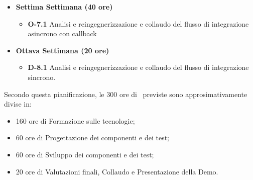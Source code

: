 \begin{itemize}
       \item \textbf{Settima Settimana (40 ore)}
       \begin{itemize}
           \item \textbf{O-7.1} Analisi e reingegnerizzazione e collaudo del flusso di integrazione asincrono con callback

       \end{itemize}

       \item \textbf{Ottava Settimana (20 ore)}
       \begin{itemize}
           \item \textbf{D-8.1} Analisi e reingegnerizzazione e collaudo del flusso di integrazione sincrono.
       \end{itemize}

\end{itemize}
\noindent
Secondo questa pianificazione, le 300 ore di \stage\ previste sono approsimativamente divise in:
\begin{itemize}
  \item 160 ore di Formazione sulle tecnologie;
  \item 60 ore di Progettazione dei componenti e dei test;
  \item 60 ore di Sviluppo dei componenti e dei test;
  \item 20 ore di Valutazioni finali, Collaudo e Presentazione della Demo.
\end{itemize}
